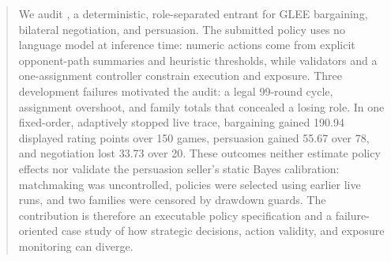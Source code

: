 \begin{abstract}
We audit \AgentName, a deterministic, role-separated entrant for GLEE
bargaining, bilateral negotiation, and persuasion. The submitted policy uses no
language model at inference time: numeric actions come from explicit
opponent-path summaries and heuristic thresholds, while validators and a
one-assignment controller constrain execution and exposure. Three development
failures motivated the audit: a legal 99-round cycle, assignment overshoot, and
family totals that concealed a losing role. In one fixed-order, adaptively
stopped live trace, bargaining gained 190.94 displayed rating points over 150
games, persuasion gained 55.67 over 78, and negotiation lost 33.73 over 20.
These outcomes neither estimate policy effects nor validate the persuasion
seller's static Bayes calibration: matchmaking was uncontrolled, policies were
selected using earlier live runs, and two families were censored by drawdown
guards. The contribution is therefore an executable policy specification and a
failure-oriented case study of how strategic decisions, action validity, and
exposure monitoring can diverge.
\end{abstract}
